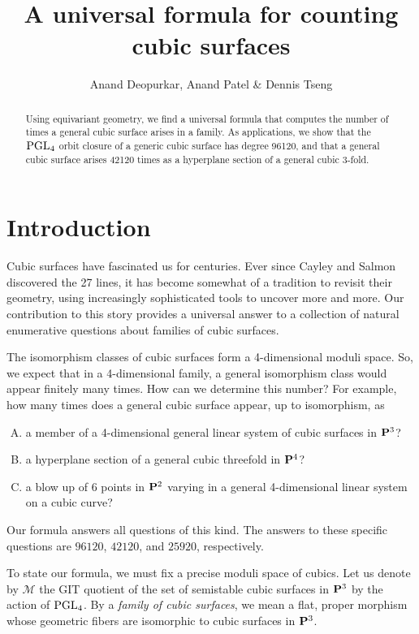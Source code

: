 \documentclass[12pt,reqno]{amsart}
\title{A universal formula for counting cubic surfaces}
\author{Anand Deopurkar, Anand Patel
  \& Dennis Tseng}
\numberwithin{equation}{section}
\begin{document}
\maketitle

\begin{abstract}
  Using equivariant geometry, we find a universal formula that computes the number of times a general cubic surface arises in a family.
  As applications, we show that the $\PGL_4$ orbit closure of a generic cubic surface has degree 96120, and that a general cubic surface arises 42120 times as a hyperplane section of a general cubic 3-fold.
\end{abstract}




\section{Introduction}
\label{sec:intro}

Cubic surfaces have fascinated us for centuries. Ever since Cayley and
Salmon discovered the 27 lines, it has become somewhat of a tradition
to revisit their geometry, using increasingly sophisticated tools to
uncover more and more. Our contribution to this story provides a
universal answer to a collection of natural enumerative questions
about families of cubic surfaces.

The isomorphism classes of cubic surfaces form a 4-dimensional moduli
space. So, we expect that in a 4-dimensional family, a general
isomorphism class would appear finitely many times. How can we
determine this number? For example, how many times does a general
cubic surface appear, up to isomorphism, as
\begin{enumerate}[(A)]
\item \label{orbit} a member of a 4-dimensional general linear system of cubic surfaces in $\P^3$?
\item \label{slice} a hyperplane section of a general cubic threefold in $\P^4$?
\item a blow up of 6 points in $\P^2$ varying in a general
  4-dimensional linear system on a cubic curve?
\end{enumerate}
Our formula answers all questions of this kind.  The answers to these
specific questions are $96120$, $42120$, and $25920$, respectively.

To state our formula, we must fix a precise moduli space of cubics.
Let us denote by $\mathcal M$ the GIT quotient of the set of
semistable cubic surfaces in $\P^3$ by the action of $\PGL_4$.  By a
\emph{family of cubic surfaces}, we mean a flat, proper morphism whose
geometric fibers are isomorphic to cubic surfaces in $\P^3$.
\end{document}
